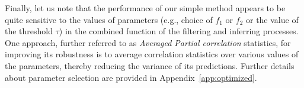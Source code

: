 \documentclass[wcp]{jmlr}
\begin{document}
Finally, let us note that the performance of our simple method appears to
be quite sensitive to the values of parameters (e.g., choice of $f_1$ or $f_2$
or the value of the threshold $\tau$) in the combined function of the
filtering and inferring processes. One approach, further referred
to as \textit{Averaged Partial correlation} statistics, for improving
its robustness is to average correlation statistics over various
values of the parameters, thereby reducing the variance of its
predictions. Further details about parameter selection are provided in
Appendix~\ref{app:optimized}.






\end{document}

